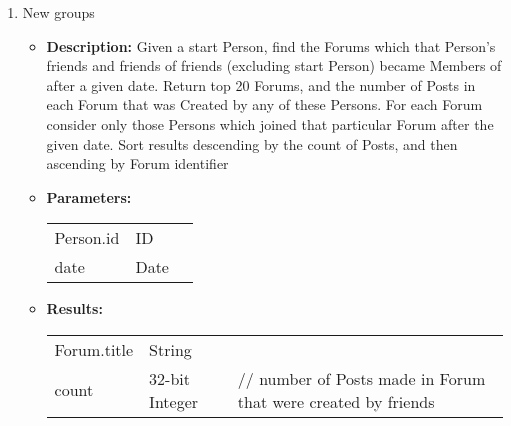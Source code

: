 {\begin{enumerate}
        \item New groups
            \begin{itemize}
                \item \textbf{Description:}
                    Given a start Person, find the Forums which that Person's friends
                    and friends of friends (excluding start Person) became Members of
                    after a given date.  Return top 20 Forums, and the number of Posts
                    in each Forum that was Created by any of these Persons.  For each
                    Forum consider only those Persons which joined that particular
                    Forum after the given date.  Sort results descending by the count
                    of Posts, and then ascending by Forum identifier
                \item \textbf{Parameters:} \\
                    \begin{tabular}{lll}
                        Person.id 										& ID & \\
                        date 											& Date & \\
                    \end{tabular}		
                \item \textbf{Results:} \\
                    \begin{tabular}{lll}
                        Forum.title 										& String & \\
                        count 	 											& 32-bit Integer & \parbox[t]{20cm}{// number of Posts made in Forum that were created 																							by friends \par \strut} \\
                    \end{tabular}		
            \end{itemize}


\end{enumerate}}
